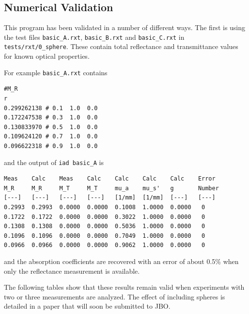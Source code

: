 \documentclass{article}
\begin{document}
\subsection{Numerical Validation}

This program has been validated in a number of different ways.  The first is using the
test files \texttt{basic\_A.rxt}, \texttt{basic\_B.rxt} and \texttt{basic\_C.rxt}
in \texttt{tests/rxt/0\_sphere}.
These contain total reflectance and transmittance values for known optical properties.

For example \texttt{basic\_A.rxt} contains
\begin{verbatim}
#M_R
r
0.299262138 # 0.1  1.0  0.0
0.172247538 # 0.3  1.0  0.0
0.130833970 # 0.5  1.0  0.0
0.109624120 # 0.7  1.0  0.0
0.096622318 # 0.9  1.0  0.0
\end{verbatim}
and the output of \texttt{iad basic\_A} is
\begin{verbatim}
Meas    Calc    Meas    Calc    Calc    Calc    Calc    Error
M_R     M_R     M_T     M_T     mu_a    mu_s'   g       Number
[---]   [---]   [---]   [---]   [1/mm]  [1/mm]  [---]   [---]
0.2993  0.2993  0.0000  0.0000  0.1008  1.0000  0.0000   0
0.1722  0.1722  0.0000  0.0000  0.3022  1.0000  0.0000   0
0.1308  0.1308  0.0000  0.0000  0.5036  1.0000  0.0000   0
0.1096  0.1096  0.0000  0.0000  0.7049  1.0000  0.0000   0
0.0966  0.0966  0.0000  0.0000  0.9062  1.0000  0.0000   0
\end{verbatim}
and the absorption coefficients are recovered with an error of about
0.5\% when only the reflectance measurement is available.

The following tables show that these results remain valid when experiments
with two or three measurements are analyzed.  The effect of including
spheres is detailed in a paper that will soon be submitted to JBO.
\end{document}
